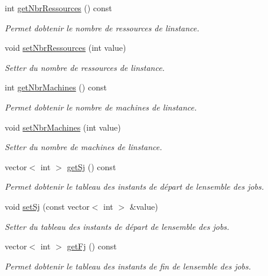 \begin{DoxyCompactItemize}
int \hyperlink{classInstance_aa69a89ba7a29d4ca426ffe4b1922cac6}{get\+Nbr\+Ressources} () const
\begin{DoxyCompactList}\small\item\em Permet d\textquotesingle{}obtenir le nombre de ressources de l\textquotesingle{}instance. \end{DoxyCompactList}\item 
void \hyperlink{classInstance_a391acee96072e5ad7270ecdbe8231bd6}{set\+Nbr\+Ressources} (int value)
\begin{DoxyCompactList}\small\item\em Setter du nombre de ressources de l\textquotesingle{}instance. \end{DoxyCompactList}\item 
int \hyperlink{classInstance_a7151797f760b20d6fc3be88ecb7b2a4b}{get\+Nbr\+Machines} () const
\begin{DoxyCompactList}\small\item\em Permet d\textquotesingle{}obtenir le nombre de machines de l\textquotesingle{}instance. \end{DoxyCompactList}\item 
void \hyperlink{classInstance_a6f61185f5b1136ba9ab2f6f01c9410b5}{set\+Nbr\+Machines} (int value)
\begin{DoxyCompactList}\small\item\em Setter du nombre de machines de l\textquotesingle{}instance. \end{DoxyCompactList}\item 
vector$<$ int $>$ \hyperlink{classInstance_a2c11032145489a3a90d3b9f1e3dfd2d4}{get\+Sj} () const
\begin{DoxyCompactList}\small\item\em Permet d\textquotesingle{}obtenir le tableau des instants de départ de l\textquotesingle{}ensemble des jobs. \end{DoxyCompactList}\item 
void \hyperlink{classInstance_a8086f6081bf72f4cce29dafcf0fdb5db}{set\+Sj} (const vector$<$ int $>$ \&value)
\begin{DoxyCompactList}\small\item\em Setter du tableau des instants de départ de l\textquotesingle{}ensemble des jobs. \end{DoxyCompactList}\item 
vector$<$ int $>$ \hyperlink{classInstance_aaf335b7258a7db93b8912f2853133620}{get\+Fj} () const
\begin{DoxyCompactList}\small\item\em Permet d\textquotesingle{}obtenir le tableau des instants de fin de l\textquotesingle{}ensemble des jobs. \end{DoxyCompactList}\item 

\end{DoxyCompactItemize}
